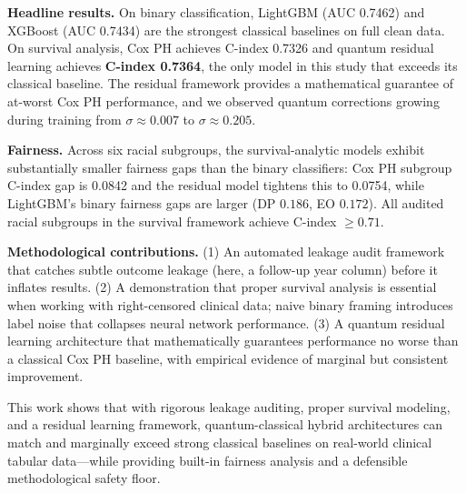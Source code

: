 \documentclass[12pt, letterpaper]{article}
\begin{document}
\textbf{Headline results.} On binary classification, LightGBM (AUC 0.7462) and XGBoost (AUC 0.7434) are the strongest classical baselines on full clean data. On survival analysis, Cox PH achieves C-index 0.7326 and quantum residual learning achieves \textbf{C-index 0.7364}, the only model in this study that exceeds its classical baseline. The residual framework provides a mathematical guarantee of at-worst Cox PH performance, and we observed quantum corrections growing during training from $\sigma \approx 0.007$ to $\sigma \approx 0.205$.

\textbf{Fairness.} Across six racial subgroups, the survival-analytic models exhibit substantially smaller fairness gaps than the binary classifiers: Cox PH subgroup C-index gap is 0.0842 and the residual model tightens this to 0.0754, while LightGBM's binary fairness gaps are larger (DP $0.186$, EO $0.172$). All audited racial subgroups in the survival framework achieve C-index $\geq 0.71$.

\textbf{Methodological contributions.} (1) An automated leakage audit framework that catches subtle outcome leakage (here, a follow-up year column) before it inflates results. (2) A demonstration that proper survival analysis is essential when working with right-censored clinical data; naive binary framing introduces label noise that collapses neural network performance. (3) A quantum residual learning architecture that mathematically guarantees performance no worse than a classical Cox PH baseline, with empirical evidence of marginal but consistent improvement.

This work shows that with rigorous leakage auditing, proper survival modeling, and a residual learning framework, quantum-classical hybrid architectures can match and marginally exceed strong classical baselines on real-world clinical tabular data---while providing built-in fairness analysis and a defensible methodological safety floor.


\break
\end{document}
